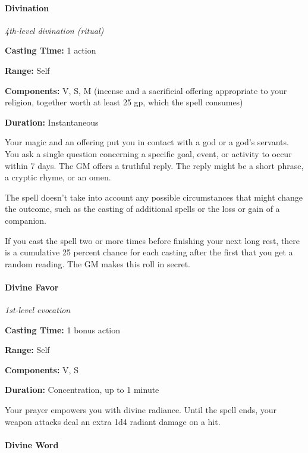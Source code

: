 \documentclass[
]{article}
\begin{document}
\hypertarget{divination}{%
\paragraph{Divination}\label{divination}}

\emph{4th-level divination (ritual)}

\textbf{Casting Time:} 1 action

\textbf{Range:} Self

\textbf{Components:} V, S, M (incense and a sacrificial offering
appropriate to your religion, together worth at least 25 gp, which the
spell consumes)

\textbf{Duration:} Instantaneous

Your magic and an offering put you in contact with a god or a god's
servants. You ask a single question concerning a specific goal, event,
or activity to occur within 7 days. The GM offers a truthful reply. The
reply might be a short phrase, a cryptic rhyme, or an omen.

The spell doesn't take into account any possible circumstances that
might change the outcome, such as the casting of additional spells or
the loss or gain of a companion.

If you cast the spell two or more times before finishing your next long
rest, there is a cumulative 25 percent chance for each casting after the
first that you get a random reading. The GM makes this roll in secret.

\hypertarget{divine-favor}{%
\paragraph{Divine Favor}\label{divine-favor}}

\emph{1st-level evocation}

\textbf{Casting Time:} 1 bonus action

\textbf{Range:} Self

\textbf{Components:} V, S

\textbf{Duration:} Concentration, up to 1 minute

Your prayer empowers you with divine radiance. Until the spell ends,
your weapon attacks deal an extra 1d4 radiant damage on a hit.

\hypertarget{divine-word}{%
\paragraph{Divine Word}\label{divine-word}}
\end{document}
